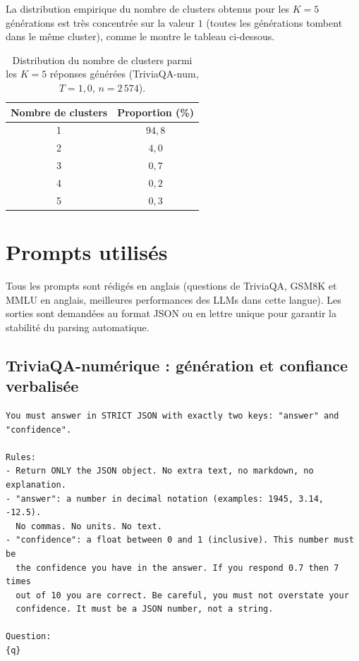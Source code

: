 \documentclass[12pt,a4paper]{article}
\begin{document}
La distribution empirique du nombre de clusters obtenus pour les $K=5$ générations est très concentrée sur la valeur $1$ (toutes les générations tombent dans le même cluster), comme le montre le tableau ci-dessous.

\begin{table}[H]
\centering
\caption{Distribution du nombre de clusters parmi les $K=5$ réponses générées (TriviaQA-num, $T=1{,}0$, $n=2\,574$).}
\small
\begin{tabular}{cc}
\toprule
Nombre de clusters & Proportion (\%) \\
\midrule
1 & $94{,}8$ \\
2 & $4{,}0$ \\
3 & $0{,}7$ \\
4 & $0{,}2$ \\
5 & $0{,}3$ \\
\bottomrule
\end{tabular}
\end{table}

\section{Prompts utilisés}
\label{ann:prompts}

Tous les prompts sont rédigés en anglais (questions de TriviaQA, GSM8K et MMLU en anglais, meilleures performances des LLMs dans cette langue). Les sorties sont demandées au format JSON ou en lettre unique pour garantir la stabilité du parsing automatique.

\subsection{TriviaQA-numérique : génération et confiance verbalisée}

\begin{verbatim}
You must answer in STRICT JSON with exactly two keys: "answer" and "confidence".

Rules:
- Return ONLY the JSON object. No extra text, no markdown, no explanation.
- "answer": a number in decimal notation (examples: 1945, 3.14, -12.5).
  No commas. No units. No text.
- "confidence": a float between 0 and 1 (inclusive). This number must be
  the confidence you have in the answer. If you respond 0.7 then 7 times
  out of 10 you are correct. Be careful, you must not overstate your
  confidence. It must be a JSON number, not a string.

Question:
{q}
\end{verbatim}
\end{document}
